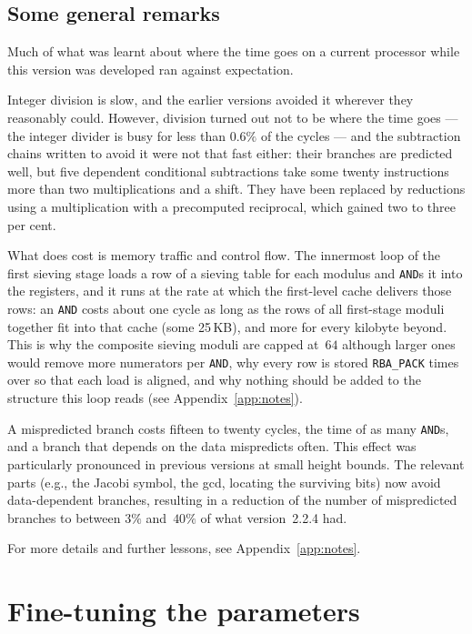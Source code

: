 \documentclass[12pt,a4paper,oneside]{amsart}
\begin{document}
\subsection{Some general remarks}\label{sec:remarks}

Much of what was learnt about where the time goes on a current processor
while this version was developed ran against expectation.

Integer division is slow,
and the earlier versions avoided it wherever they reasonably
could. However, division turned out not to be where the time goes --- the
integer divider is busy for less than $0.6\%$ of the cycles --- and the
subtraction chains written to avoid it were not that fast either: their
branches are predicted well, but five dependent conditional subtractions
take some twenty instructions more than two multiplications and a shift.
They have been replaced by reductions using a multiplication with a
precomputed reciprocal, which gained two to three per cent.

What does cost is memory traffic and control flow. The innermost loop of
the first sieving stage loads a row of a sieving table for each modulus and
\texttt{AND}s it into the registers, and it runs at the rate at which the
first-level cache delivers those rows: an \texttt{AND} costs about one cycle
as long as the rows of all first-stage moduli together fit into that cache
(some 25\,KB), and more for every kilobyte beyond. This is why the composite
sieving moduli are capped at~$64$ although larger ones would remove more
numerators per \texttt{AND}, why every row is stored \texttt{RBA\_PACK}
times over so that each load is aligned, and why nothing should be added to
the structure this loop reads (see Appendix~\ref{app:notes}).

A mispredicted branch costs fifteen to twenty cycles, the time of as many
\texttt{AND}s, and a branch that depends on the data mispredicts often.
This effect was particularly pronounced in previous versions at small height bounds.
The relevant parts (e.g., the Jacobi symbol, the gcd, locating the surviving
bits) now avoid data-dependent branches, resulting in a reduction of
the number of mispredicted branches to between $3\%$ and~$40\%$ of
what version~2.2.4 had.

For more details and further lessons, see Appendix~\ref{app:notes}.


\section{Fine-tuning the parameters}\label{sec:tuning}
\end{document}
